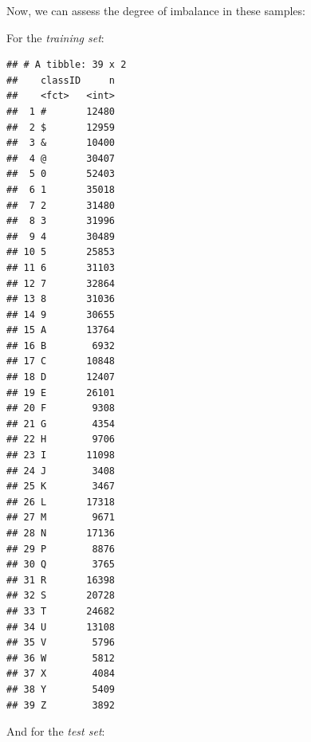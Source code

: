 \documentclass[
]{report}
\newenvironment{Shaded}{\begin{snugshade}}{\end{snugshade}}
\newcommand{\AttributeTok}[1]{\textcolor[rgb]{0.13,0.29,0.53}{#1}}
\newcommand{\FunctionTok}[1]{\textcolor[rgb]{0.13,0.29,0.53}{\textbf{#1}}}
\newcommand{\NormalTok}[1]{#1}
\newcommand{\SpecialCharTok}[1]{\textcolor[rgb]{0.81,0.36,0.00}{\textbf{#1}}}
\begin{document}
Now, we can assess the degree of imbalance in these samples:

\newpage

For the \emph{training set}:

\begin{Shaded}
\end{Shaded}

\footnotesize

\begin{verbatim}
## # A tibble: 39 x 2
##    classID     n
##    <fct>   <int>
##  1 #       12480
##  2 $       12959
##  3 &       10400
##  4 @       30407
##  5 0       52403
##  6 1       35018
##  7 2       31480
##  8 3       31996
##  9 4       30489
## 10 5       25853
## 11 6       31103
## 12 7       32864
## 13 8       31036
## 14 9       30655
## 15 A       13764
## 16 B        6932
## 17 C       10848
## 18 D       12407
## 19 E       26101
## 20 F        9308
## 21 G        4354
## 22 H        9706
## 23 I       11098
## 24 J        3408
## 25 K        3467
## 26 L       17318
## 27 M        9671
## 28 N       17136
## 29 P        8876
## 30 Q        3765
## 31 R       16398
## 32 S       20728
## 33 T       24682
## 34 U       13108
## 35 V        5796
## 36 W        5812
## 37 X        4084
## 38 Y        5409
## 39 Z        3892
\end{verbatim}

\normalsize

\newpage

And for the \emph{test set}:

\begin{Shaded}
\end{Shaded}

\footnotesize
\end{document}
